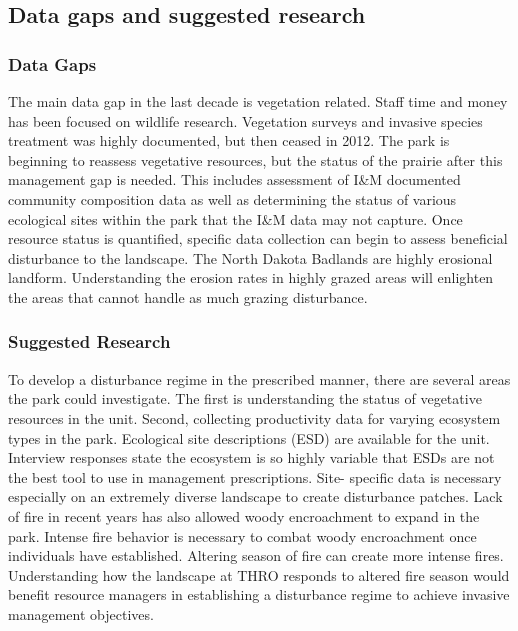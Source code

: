 \subsection{Data gaps and suggested research}

\subsubsection{Data Gaps}

The main data gap in the last decade is vegetation related. 
Staff time and money has been focused on wildlife research. 
Vegetation surveys and invasive species treatment was highly documented, but then ceased in 2012. 
The park is beginning to reassess vegetative resources, but the status of the prairie after this management gap is needed. 
This includes assessment of I\&M documented community composition data as well as determining the status of various ecological sites within the park that the I\&M data may not capture. 
Once resource status is quantified, specific data collection can begin to assess beneficial disturbance to the landscape. 
The North Dakota Badlands are highly erosional landform. 
Understanding the erosion rates in highly grazed areas will enlighten the areas that cannot handle as much grazing disturbance.

\subsubsection{Suggested Research}

To develop a disturbance regime in the prescribed manner, there are several areas the park could investigate. 
The first is understanding the status of vegetative resources in the unit. 
Second, collecting productivity data for varying ecosystem types in the park. 
Ecological site descriptions (ESD) are available for the unit. 
Interview responses state the ecosystem is so highly variable that ESDs are not the best tool to use in management prescriptions. 
Site- specific data is necessary especially on an extremely diverse landscape to create disturbance patches. 
Lack of fire in recent years has also allowed woody encroachment to expand in the park. 
Intense fire behavior is necessary to combat woody encroachment once individuals have established. 
Altering season of fire can create more intense fires. 
Understanding how the landscape at THRO responds to altered fire season would benefit resource managers in establishing a disturbance regime to achieve invasive management objectives.

